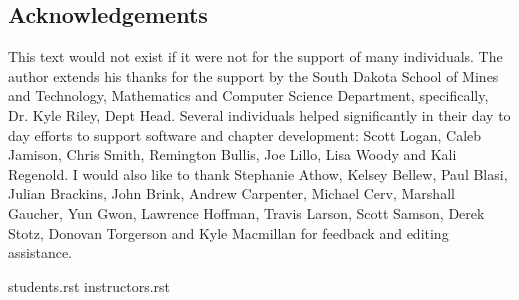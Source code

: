 \hypertarget{acknowledgements}{%
\subsection{Acknowledgements}\label{acknowledgements}}

This text would not exist if it were not for the support of many
individuals. The author extends his thanks for the support by the South
Dakota School of Mines and Technology, Mathematics and Computer Science
Department, specifically, Dr. Kyle Riley, Dept Head. Several individuals
helped significantly in their day to day efforts to support software and
chapter development: Scott Logan, Caleb Jamison, Chris Smith, Remington
Bullis, Joe Lillo, Lisa Woody and Kali Regenold. I would also like to
thank Stephanie Athow, Kelsey Bellew, Paul Blasi, Julian Brackins, John
Brink, Andrew Carpenter, Michael Cerv, Marshall Gaucher, Yun Gwon,
Lawrence Hoffman, Travis Larson, Scott Samson, Derek Stotz, Donovan
Torgerson and Kyle Macmillan for feedback and editing assistance.

students.rst instructors.rst

